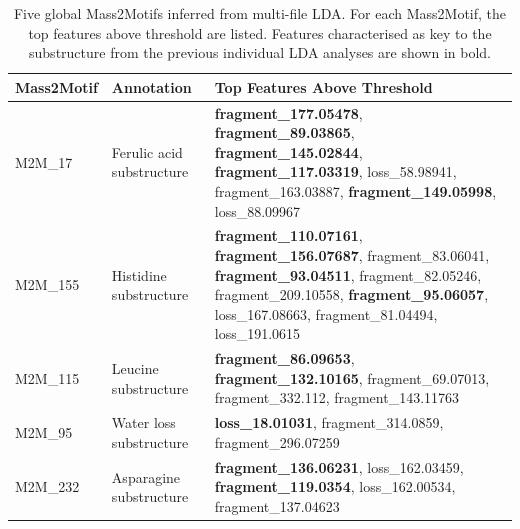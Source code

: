 \begin{table}[!tbhp]
\small
\centering
\begin{tabular}{|l|l|p{3.8cm}|}
\hline
Mass2Motif & Annotation                & Top Features Above Threshold                                                                                                                                                                           \\ \hline
M2M\_17           & Ferulic acid substructure & \textbf{fragment\_177.05478}, \textbf{fragment\_89.03865}, \textbf{fragment\_145.02844}, \textbf{fragment\_117.03319}, loss\_58.98941, \newline fragment\_163.03887, \textbf{fragment\_149.05998}, loss\_88.09967 \\ \hline
M2M\_155          & Histidine substructure    & \textbf{fragment\_110.07161}, \textbf{fragment\_156.07687}, fragment\_83.06041, \textbf{fragment\_93.04511}, fragment\_82.05246, fragment\_209.10558, \textbf{fragment\_95.06057}, loss\_167.08663, fragment\_81.04494, loss\_191.0615 \\ \hline
M2M\_115          & Leucine substructure      & \textbf{fragment\_86.09653}, \textbf{fragment\_132.10165}, fragment\_69.07013, fragment\_332.112, fragment\_143.11763 \\ \hline
M2M\_95           & Water loss substructure   & \textbf{loss\_18.01031}, \newline fragment\_314.0859, \newline fragment\_296.07259                                                                                                              \\ \hline
M2M\_232          & Asparagine substructure   & \textbf{fragment\_136.06231}, loss\_162.03459, \textbf{fragment\_119.0354}, loss\_162.00534, \newline fragment\_137.04623 \\ \hline
\end{tabular}
\caption{Five global Mass2Motifs inferred from multi-file LDA. For each Mass2Motif, the top features above threshold are listed. Features characterised as key to the substructure from the previous individual LDA analyses are shown in bold.}
\label{tab:multifile-results}
\end{table}

